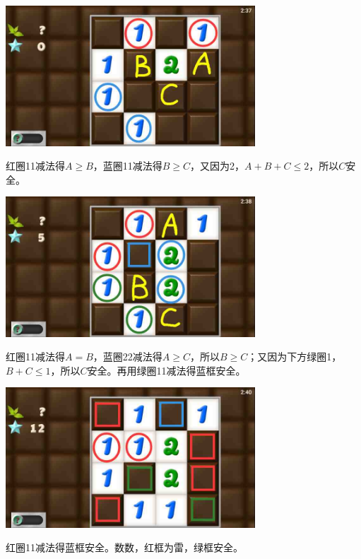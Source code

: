 \subsection{} %
\begin{center}
    \includegraphics[width=0.7\textwidth]{puzzlelow/150-1.jpg}
\end{center}
红圈11减法得$A\ge B$，蓝圈11减法得$B\ge C$，又因为2，$A+B+C\le 2$，所以$C$安全。
\begin{center}
    \includegraphics[width=0.7\textwidth]{puzzlelow/150-2.jpg}
\end{center}
红圈11减法得$A=B$，蓝圈22减法得$A\ge C$，所以$B\ge C$；又因为下方绿圈1，$B+C\le 1$，所以$C$安全。再用绿圈11减法得蓝框安全。
\begin{center}
    \includegraphics[width=0.7\textwidth]{puzzlelow/150-3.jpg}
\end{center}
红圈11减法得蓝框安全。数数，红框为雷，绿框安全。


